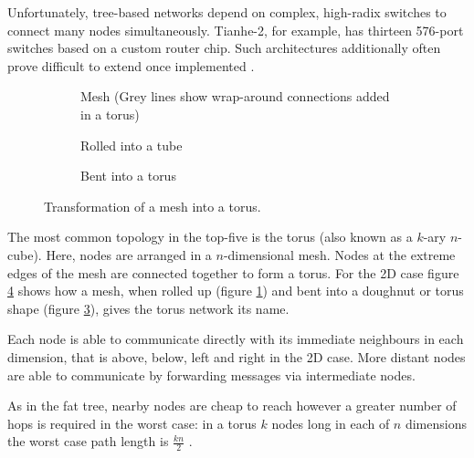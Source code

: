 				Unfortunately, tree-based networks depend on complex, high-radix
				switches to connect many nodes simultaneously.  Tianhe-2, for example,
				has thirteen 576-port switches based on a custom router chip. Such
				architectures additionally often prove difficult to extend once
				implemented \cite{dally04}.
				
				\begin{figure}
					\begin{subfigure}[t]{\textwidth}
						\center
						
						\caption{Mesh (Grey lines show wrap-around connections added in a
						torus)}
						\label{fig:torus-flat}
					\end{subfigure}
					
					\vspace{1em}
					
					\begin{subfigure}[t]{\textwidth}
						\center
						
						\caption{Rolled into a tube}
						\label{fig:torus-pipe}
					\end{subfigure}
					
					\vspace{1em}
					
					\begin{subfigure}[t]{\textwidth}
						\center
						
						\caption{Bent into a torus}
						\label{fig:torus-3D}
					\end{subfigure}
					
					\caption{Transformation of a mesh into a torus.}
					\label{fig:forming-a-torus}
				\end{figure}
			
				The most common topology in the top-five is the torus (also known as a
				$k$-ary $n$-cube). Here, nodes are arranged in a $n$-dimensional mesh.
				Nodes at the extreme edges of the mesh are connected together to form a
				torus. For the 2D case figure \ref{fig:forming-a-torus} shows how a
				mesh, when rolled up (figure \ref{fig:torus-flat}) and bent into a
				doughnut or torus shape (figure \ref{fig:torus-3D}), gives the torus
				network its name.
				
				Each node is able to communicate directly with its immediate neighbours
				in each dimension, that is above, below, left and right in the 2D case.
				More distant nodes are able to communicate by forwarding messages via
				intermediate nodes.
				
				As in the fat tree, nearby nodes are cheap to reach however a greater
				number of hops is required in the worst case: in a torus $k$ nodes long
				in each of $n$ dimensions the worst case path length is $\frac{kn}{2}$
				\cite{dally04}.
				
